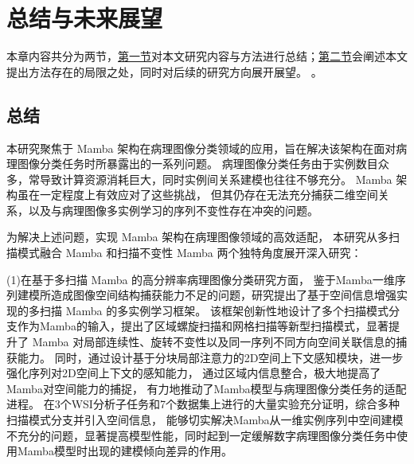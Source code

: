 \chapter[\hspace{0pt}总结与未来展望]{{\heiti{}\hspace{0pt}总结与未来展望}}\label{section 7}
\removelofgap
\removelotgap

本章内容共分为两节，\hyperref[section5: 总结]{第一节}对本文研究内容与方法进行总结；\hyperref[section5: 未来展望]{第二节}会阐述本文提出方法存在的局限之处，同时对后续的研究方向展开展望。
。

\section[\hspace{-2pt}总结]{{\heiti{} \hspace{-8pt}总结}}\label{section5: 总结}


本研究聚焦于 Mamba 架构在病理图像分类领域的应用，旨在解决该架构在面对病理图像分类任务时所暴露出的一系列问题。
病理图像分类任务由于实例数目众多，常导致计算资源消耗巨大，同时实例间关系建模也往往不够充分。
Mamba 架构虽在一定程度上有效应对了这些挑战，
但其仍存在无法充分捕获二维空间关系，以及与病理图像多实例学习的序列不变性存在冲突的问题。​

为解决上述问题，实现 Mamba 架构在病理图像领域的高效适配，
本研究从多扫描模式融合 Mamba 和扫描不变性 Mamba 两个独特角度展开深入研究：

(1)在基于多扫描 Mamba 的高分辨率病理图像分类研究方面，
鉴于Mamba一维序列建模所造成图像空间结构捕获能力不足的问题，研究提出了基于空间信息增强实现的多扫描 Mamba 的多实例学习框架。
该框架创新性地设计了多个扫描模式分支作为Mamba的输入，提出了区域螺旋扫描和网格扫描等新型扫描模式，显著提升了 Mamba 对局部连续性、旋转不变性以及同一序列不同方向空间关联信息的捕获能力。
同时，通过设计基于分块局部注意力的2D空间上下文感知模块，进一步强化序列对2D空间上下文的感知能力，
通过区域内信息整合，极大地提高了Mamba对空间能力的捕捉，
有力地推动了Mamba模型与病理图像分类任务的适配进程。
在3个WSI分析子任务和7个数据集上进行的大量实验充分证明，综合多种扫描模式分支并引入空间信息，
能够切实解决Mamba从一维实例序列中空间建模不充分的问题，显著提高模型性能，同时起到一定缓解数字病理图像分类任务中使用Mamba模型时出现的建模倾向差异的作用。​

